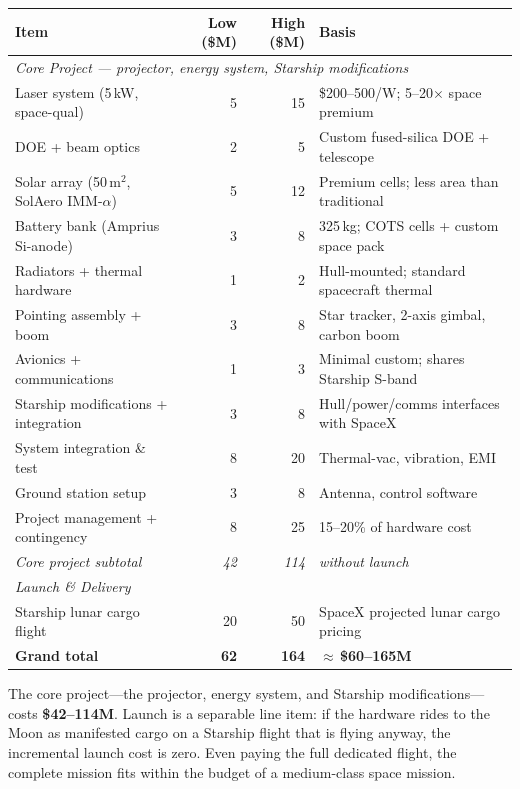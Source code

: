 \documentclass[12pt,letterpaper]{article}
\begin{document}
\begin{center}
\begin{tabular}{lrrl}
\toprule
\textbf{Item} & \textbf{Low (\$M)} & \textbf{High (\$M)} & \textbf{Basis} \\
\midrule
\multicolumn{4}{l}{\textit{Core Project --- projector, energy system, Starship modifications}} \\
\midrule
Laser system (5\,kW, space-qual) & 5 & 15 & \$200--500/W; 5--20$\times$ space premium \\
DOE + beam optics & 2 & 5 & Custom fused-silica DOE + telescope \\
Solar array (50\,m$^2$, SolAero IMM-$\alpha$) & 5 & 12 & Premium cells; less area than traditional \\
Battery bank (Amprius Si-anode) & 3 & 8 & 325\,kg; COTS cells + custom space pack \\
Radiators + thermal hardware & 1 & 2 & Hull-mounted; standard spacecraft thermal \\
Pointing assembly + boom & 3 & 8 & Star tracker, 2-axis gimbal, carbon boom \\
Avionics + communications & 1 & 3 & Minimal custom; shares Starship S-band \\
Starship modifications + integration & 3 & 8 & Hull/power/comms interfaces with SpaceX \\
System integration \& test & 8 & 20 & Thermal-vac, vibration, EMI \\
Ground station setup & 3 & 8 & Antenna, control software \\
Project management + contingency & 8 & 25 & 15--20\% of hardware cost \\
\midrule
\textit{Core project subtotal} & \textit{42} & \textit{114} & \textit{without launch} \\
\midrule
\multicolumn{4}{l}{\textit{Launch \& Delivery}} \\
\midrule
Starship lunar cargo flight & 20 & 50 & SpaceX projected lunar cargo pricing \\
\midrule
\textbf{Grand total} & \textbf{62} & \textbf{164} & \textbf{$\approx$\,\$60--165M} \\
\bottomrule
\end{tabular}
\end{center}

\noindent The core project---the projector, energy system, and Starship
modifications---costs \textbf{\$42--114M}. Launch is a separable line item:
if the hardware rides to the Moon as manifested cargo on a Starship flight
that is flying anyway, the incremental launch cost is zero. Even paying the
full dedicated flight, the complete mission fits within the budget of a
medium-class space mission.
\end{document}

